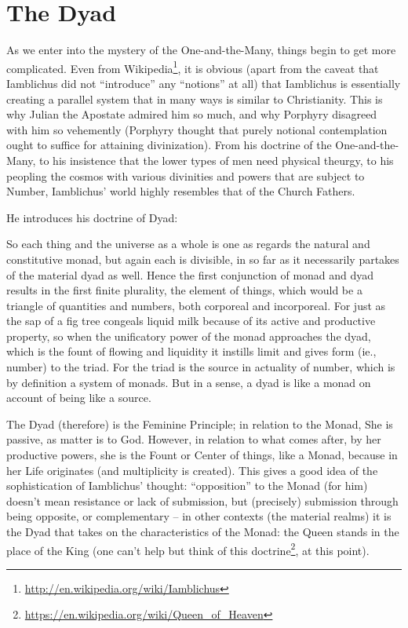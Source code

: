 \section{The Dyad}

As we enter into the mystery of the One-and-the-Many, things begin to get more complicated. Even from Wikipedia\footnote{\url{http://en.wikipedia.org/wiki/Iamblichus}}, it is obvious (apart from the caveat that Iamblichus did not ``introduce'' any ``notions'' at all) that Iamblichus is essentially creating a parallel system that in many ways is similar to Christianity. This is why Julian the Apostate admired him so much, and why Porphyry disagreed with him so vehemently (Porphyry thought that purely notional contemplation ought to suffice for attaining divinization). From his doctrine of the One-and-the-Many, to his insistence that the lower types of men need physical theurgy, to his peopling the cosmos with various divinities and powers that are subject to Number, Iamblichus' world highly resembles that of the Church Fathers.

He introduces his doctrine of Dyad:

\begin{quotex}
So each thing and the universe as a whole is one as regards the natural and constitutive monad, but again each is divisible, in so far as it necessarily partakes of the material dyad as well. Hence the first conjunction of monad and dyad results in the first finite plurality, the element of things, which would be a triangle of quantities and numbers, both corporeal and incorporeal. For just as the sap of a fig tree congeals liquid milk because of its active and productive property, so when the unificatory power of the monad approaches the dyad, which is the fount of flowing and liquidity it instills limit and gives form (ie., number) to the triad. For the triad is the source in actuality of number, which is by definition a system of monads. But in a sense, a dyad is like a monad on account of being like a source.
\end{quotex}


The Dyad (therefore) is the Feminine Principle; in relation to the Monad, She is passive, as matter is to God. However, in relation to what comes after, by her productive powers, she is the Fount or Center of things, like a Monad, because in her Life originates (and multiplicity is created). This gives a good idea of the sophistication of Iamblichus' thought: ``opposition'' to the Monad (for him) doesn't mean resistance or lack of submission, but (precisely) submission through being opposite, or complementary -- in other contexts (the material realms) it is the Dyad that takes on the characteristics of the Monad: the Queen stands in the place of the King (one can't help but think of this doctrine\footnote{\url{https://en.wikipedia.org/wiki/Queen\_of\_Heaven}}, at this point).

